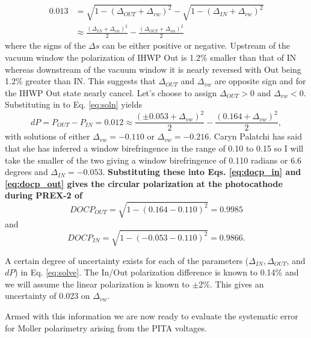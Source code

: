 \documentclass[12pt]{article}
\begin{document}
\begin{equation}
\label{eq:soln}
\begin{split}
0.013&=\sqrt{1-(\Delta_{OUT}+\Delta_{vw})^2}-\sqrt{1-(\Delta_{IN}+\Delta_{vw})^2}\\
~&\approx\frac{\left(\Delta_{IN}+\Delta_{vw}\right)^2}{2}-\frac{\left(\Delta_{OUT}+\Delta_{vw}\right)^2}{2}
\end{split}
\end{equation}
where the signs of the $\Delta s$ can be either positive or negative. Upstream of the vacuum window the polarization of IHWP Out is 1.2\% smaller than that of IN whereas downstream of the vacuum window it is nearly reversed with Out being 1.2\% greater than IN.  This suggests that $\Delta_{OUT}$ and $\Delta_{vw}$ are opposite sign and for the IHWP Out state nearly cancel.  Let's choose to assign $\Delta_{OUT}>0$ and $\Delta_{vw}<0$. Substituting in to Eq. \ref{eq:soln} yields
\begin{equation}
\label{eq:solve}
dP=P_{OUT}-P_{IN}=0.012 \approx \frac{\left(\pm0.053+\Delta_{vw}\right)^2}{2}-\frac{\left(0.164+\Delta_{vw}\right)^2}{2},
\end{equation}
with solutions of either $\Delta_{vw}=-0.110$ or $\Delta_{vw}=-0.216$. Caryn Palatchi has said that she has inferred a window birefringence in the range of 0.10 to 0.15 so I will take the smaller of the two giving a window birefringence of 0.110 radians or 6.6 degrees and $\Delta_{IN}=-0.053$.  \textbf{Substituting these into Eqs. \ref{eq:docp_in} and \ref{eq:docp_out}  gives the circular polarization at the photocathode during PREX-2 of }
\[DOCP_{OUT}=\sqrt{1-(0.164-0.110)^2}=0.9985
\]
 and
 \[DOCP_{IN}=\sqrt{1-(-0.053-0.110)^2}=0.9866.
 \]

A certain degree of uncertainty exists for each of the parameters ($\Delta_{IN}, \Delta_{OUT}$, and $dP$) in Eq. \ref{eq:solve}. The In/Out polarization difference is known to 0.14\% and we will assume the linear polarization is known to $\pm$2\%. This gives an uncertainty of 0.023 on $\Delta_{vw}$.

Armed with this information we are now ready to evaluate the systematic error for Moller polarimetry arising from the PITA voltages.
\end{document}
